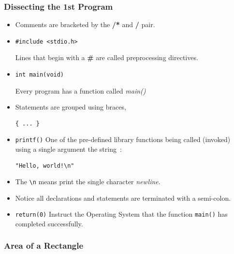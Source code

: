 \begin{frame}[fragile]
\frametitle{Dissecting the 1st Program}

\begin{itemize}[<+->]
\item Comments are bracketed by the {\bf /*} and {\bf */} pair.
\item
\begin{verbatim}
#include <stdio.h>
\end{verbatim}
Lines that begin with a {\bf \#}
are called preprocessing directives.
\item \begin{verbatim}
int main(void)
\end{verbatim}
Every program has a function called {\em main()}

\item Statements are grouped using braces,
\begin{verbatim}
{ ... }
\end{verbatim}

\item \verb+printf()+ One of the pre-defined library functions being called (invoked) using a single argument the string~:
\begin{verbatim}
"Hello, world!\n"
\end{verbatim}
\item The \verb+\n+ means print the single character {\it newline}.
\item Notice all declarations and statements are terminated with a
semi-colon.
\item \verb+return(0)+
Instruct the Operating System that the function
\verb+main()+ has completed successfully.
\end{itemize}
\end{frame}



\begin{frame}[fragile]
\frametitle{Area of a Rectangle}
\begin{columns}

\begin{column}{0.9\textwidth}

\end{column}

\end{columns}
\end{frame}


